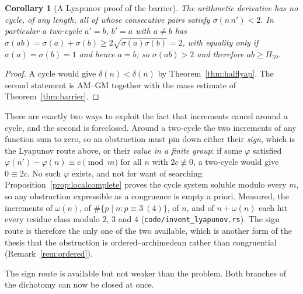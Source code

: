 \documentclass[11pt]{article}
\newtheorem{corollary}[theorem]{Corollary}
\theoremstyle{definition}
\begin{document}
\begin{corollary}[A Lyapunov proof of the barrier]\label{cor:lyapbarrier}
The arithmetic derivative has no cycle, of any length, all of whose consecutive pairs satisfy
$\sigma(n\,n')<2$. In particular a two-cycle $a'=b$, $b'=a$ with $a\neq b$ has
$\sigma(ab)=\sigma(a)+\sigma(b)\ge2\sqrt{\sigma(a)\sigma(b)}=2$, with equality only if
$\sigma(a)=\sigma(b)=1$ and hence $a=b$; so $\sigma(ab)>2$ and therefore $ab\ge\Pi_{59}$.
\end{corollary}
\begin{proof}
A cycle would give $\delta(n)<\delta(n)$ by Theorem~\ref{thm:halflyap}. The second statement is
AM--GM together with the mass estimate of Theorem~\ref{thm:barrier}.
\end{proof}

There are exactly two ways to exploit the fact that increments cancel around a cycle, and the
second is foreclosed. Around a two-cycle the two increments of any function sum to zero, so an
obstruction must pin down either their \emph{sign}, which is the Lyapunov route above, or their
\emph{value in a finite group}: if some $\varphi$ satisfied
$\varphi(n')-\varphi(n)\equiv c\pmod m$ for all $n$ with $2c\not\equiv0$, a two-cycle would give
$0\equiv2c$. No such $\varphi$ exists, and not for want of searching:
Proposition~\ref{prop:localcomplete} proves the cycle system soluble modulo every $m$, so any
obstruction expressible as a congruence is empty a priori. Measured, the increments of
$\omega(n)$, of $\#\{p\mid n:p\equiv3\ (4)\}$, of $n$, and of $n+\omega(n)$ each hit every residue
class modulo $2$, $3$ and $4$ \textup{(\texttt{code/invent\_lyapunov.rs})}. The sign route is
therefore the only one of the two available, which is another form of the thesis that the
obstruction is ordered--archimedean rather than congruential (Remark~\ref{rem:ordered}).

The sign route is available but not weaker than the problem. Both branches of the
dichotomy can now be closed at once.
\end{document}
